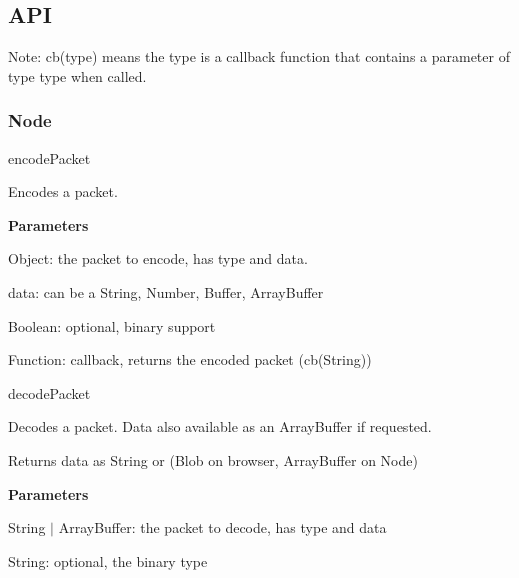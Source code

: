 \subsection*{A\+PI}

Note\+: {\ttfamily cb(type)} means the type is a callback function that contains a parameter of type {\ttfamily type} when called.

\subsubsection*{Node}


\begin{DoxyItemize}
\item {\ttfamily encode\+Packet}
\begin{DoxyItemize}
\item Encodes a packet.
\item {\bfseries Parameters}
\begin{DoxyItemize}
\item {\ttfamily Object}\+: the packet to encode, has {\ttfamily type} and {\ttfamily data}.
\begin{DoxyItemize}
\item {\ttfamily data}\+: can be a {\ttfamily String}, {\ttfamily Number}, {\ttfamily Buffer}, {\ttfamily Array\+Buffer}
\end{DoxyItemize}
\item {\ttfamily Boolean}\+: optional, binary support
\item {\ttfamily Function}\+: callback, returns the encoded packet ({\ttfamily cb(\+String)})
\end{DoxyItemize}
\end{DoxyItemize}
\item {\ttfamily decode\+Packet}
\begin{DoxyItemize}
\item Decodes a packet. Data also available as an Array\+Buffer if requested.
\item Returns data as {\ttfamily String} or ({\ttfamily Blob} on browser, {\ttfamily Array\+Buffer} on Node)
\item {\bfseries Parameters}
\begin{DoxyItemize}
\item {\ttfamily String} $\vert$ {\ttfamily Array\+Buffer}\+: the packet to decode, has {\ttfamily type} and {\ttfamily data}
\item {\ttfamily String}\+: optional, the binary type
\end{DoxyItemize}

\end{DoxyItemize}
\end{DoxyItemize}
